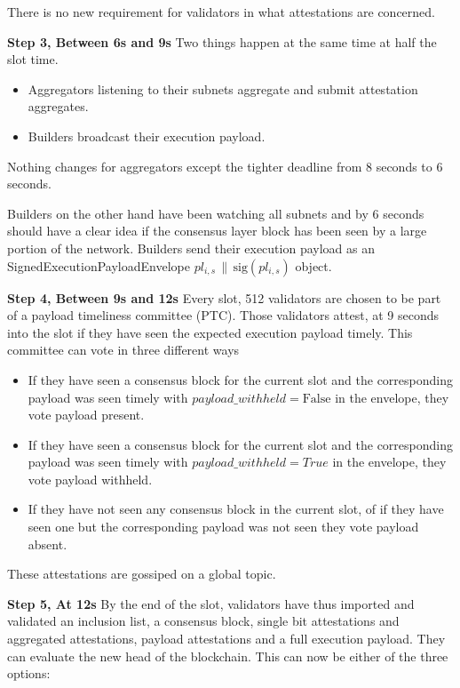 There is no new requirement for validators in what attestations are concerned.

\noindent\textbf{Step 3, Between 6s and 9s} Two things happen at the same time at half the slot time.

\begin{itemize}
  \item Aggregators listening to their subnets aggregate and submit attestation aggregates.
  \item Builders broadcast their execution payload.
\end{itemize}

Nothing changes for aggregators except the tighter deadline from 8 seconds to 6 seconds.

Builders on the other hand have been watching all subnets and by 6 seconds should have a clear idea if the consensus layer block has been seen by a large portion of the network.
Builders send their execution payload as an SignedExecutionPayloadEnvelope $pl_{i,s}\,\|\,\mathrm{sig}(pl_{i,s})$ object.

\noindent\textbf{Step 4, Between 9s and 12s}
Every slot, 512 validators are chosen to be part of a payload timeliness committee (PTC). Those validators attest, at 9 seconds into the slot if they have seen the expected execution payload timely. This committee can vote in three different ways

\begin{itemize}
  \item If they have seen a consensus block for the current slot and the corresponding payload was seen timely with $payload\_withheld = \mathrm{False}$ in the envelope, they vote payload present.
  \item If they have seen a consensus block for the current slot and the corresponding payload was seen timely with $payload\_withheld = True$ in the envelope, they vote payload withheld.
  \item If they have not seen any consensus block in the current slot, of if they have seen one but the corresponding payload was not seen they vote payload absent.
\end{itemize}
    
These attestations are gossiped on a global topic.

\noindent\textbf{Step 5, At 12s}
By the end of the slot, validators have thus imported and validated an inclusion list, a consensus block, single bit attestations and aggregated attestations, payload attestations and a full execution payload. They can evaluate the new head of the blockchain. This can now be either of the three options:

